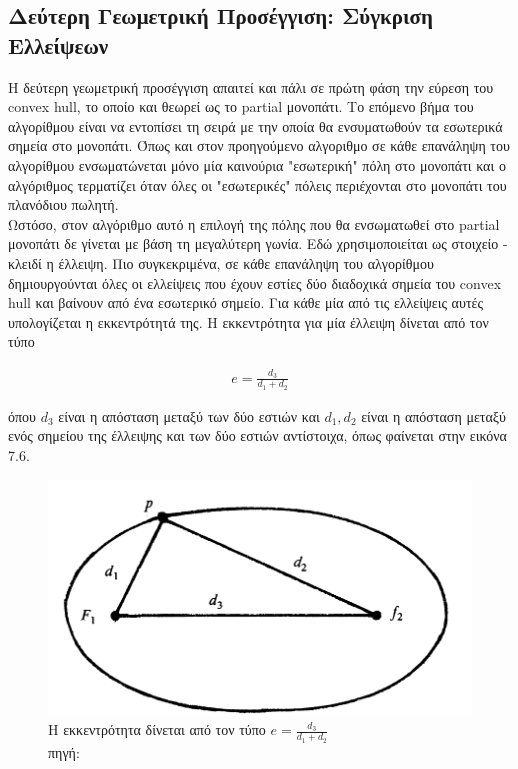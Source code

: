 \documentclass[oneside,12pt]{book}
\newenvironment{matlab}
	{\begin{figure}[hp]\centering\captionsetup{justification=centering}}
	{\end{figure}}
\theoremstyle{definition}
\begin{document}
\subsection{Δεύτερη Γεωμετρική Προσέγγιση: Σύγκριση Ελλείψεων}

Η δεύτερη γεωμετρική προσέγγιση απαιτεί και πάλι σε πρώτη φάση την εύρεση του convex hull, το οποίο και θεωρεί ως το partial μονοπάτι. Το επόμενο βήμα του αλγορίθμου είναι να εντοπίσει τη σειρά με την οποία θα ενσυματωθούν τα εσωτερικά σημεία στο μονοπάτι. Όπως και στον προηγούμενο αλγοριθμο σε κάθε επανάληψη του αλγορίθμου ενσωματώνεται μόνο μία καινούρια "εσωτερική" πόλη στο μονοπάτι και ο αλγόριθμος τερματίζει όταν όλες οι "εσωτερικές" πόλεις περιέχονται στο μονοπάτι του πλανόδιου πωλητή. \\

Ωστόσο, στον αλγόριθμο αυτό η επιλογή της πόλης που θα ενσωματωθεί στο partial μονοπάτι δε γίνεται με βάση τη μεγαλύτερη γωνία. Εδώ χρησιμοποιείται ως στοιχείο - κλειδί η έλλειψη. Πιο συγκεκριμένα, σε κάθε επανάληψη του αλγορίθμου δημιουργούνται όλες οι ελλείψεις που έχουν εστίες δύο διαδοχικά σημεία του convex hull και βαίνουν από ένα εσωτερικό σημείο. Για κάθε μία από τις ελλείψεις αυτές υπολογίζεται η εκκεντρότητά της. Η εκκεντρότητα για μία έλλειψη δίνεται από τον τύπο

\begin{align*}
	e = \frac{d_3}{d_1 + d_2}
\end{align*}

όπου \(d_3\) είναι η απόσταση μεταξύ των δύο εστιών και \(d_1, d_2\) είναι η απόσταση μεταξύ ενός σημείου της έλλειψης και των δύο εστιών αντίστοιχα, όπως φαίνεται στην εικόνα 7.6. \\

\begin{matlab}
	\includegraphics[scale=0.3]{images/geometric_approach_ellipse1.png}
	\caption{Η εκκεντρότητα δίνεται από τον τύπο \(e = \frac{d_3}{d_1 + d_2}\)\\ πηγή: \cite{16}}
\end{matlab}
\end{document}
